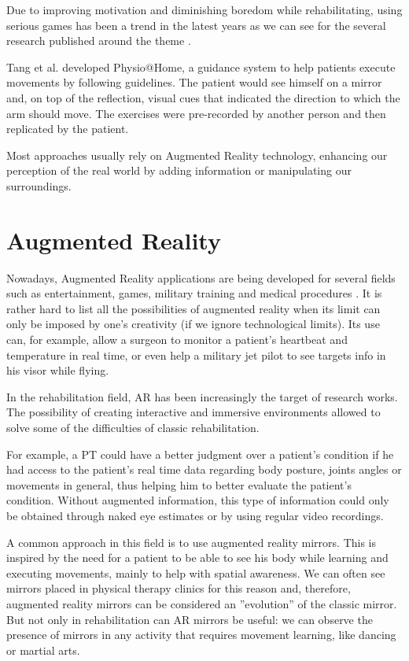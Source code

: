 Due to improving motivation and diminishing boredom while rehabilitating, using serious games
has been a trend in the latest years as we can see for the several 
research published around the theme \cite{Schonauer2011c, Ma2008, Burke2009, Borghese2013, Lange2012}. 

Tang et al. \cite{Tang2014a} developed Physio@Home, a guidance system to help patients execute movements by following
guidelines. The patient would see himself on a mirror and, on top of the reflection, visual cues that 
indicated the direction to which the arm should move. The exercises were pre-recorded by another person and 
then replicated by the patient.

Most approaches usually rely on Augmented Reality technology, enhancing our perception of the real world
by adding information or manipulating our surroundings.  

\section{Augmented Reality}
\label{RW-AR}

Nowadays, Augmented Reality applications 
are being developed for several fields such as entertainment, games, military training 
and medical procedures \cite{Guimaraes2014a, Rego2010}. 
It is rather hard to list all the possibilities of augmented reality when its limit can only be imposed by one's creativity (if we ignore technological limits).
Its use can, for example, allow a surgeon to monitor a patient's heartbeat 
and temperature in real time, or even help a military jet pilot to see targets info in his visor while flying.

In the rehabilitation field, \ac{AR} has been increasingly the target of research works.
The possibility of creating interactive and immersive environments
allowed to solve some of the difficulties of classic rehabilitation.

For example, a PT could have a better judgment over a patient's condition if he 
had access to the patient's real time data regarding body posture, joints angles or movements in general, thus helping him to better evaluate the patient's condition. 
Without augmented information, this type of information could only be obtained through naked eye 
estimates or by using regular video recordings.

A common approach in this field is to use augmented reality mirrors. 
This is inspired by the need for a patient to be able to see his body while
learning and executing movements, mainly to help with spatial awareness. We can often
see mirrors placed in physical therapy clinics for this reason and, therefore, 
augmented reality mirrors can be considered an ''evolution'' of the classic mirror.
But not only in rehabilitation can \ac{AR} mirrors be useful: we can observe 
the presence of mirrors in any activity that requires movement learning, like dancing or martial arts.

